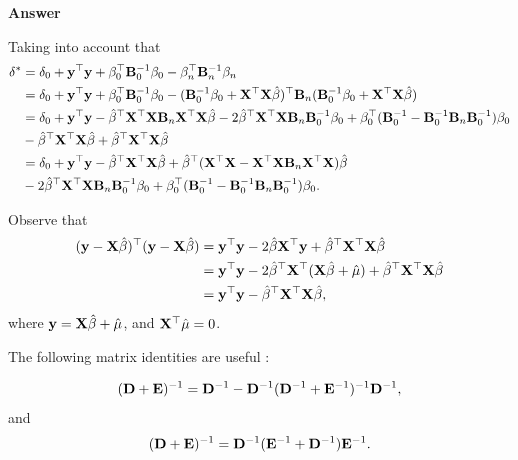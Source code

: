 \begin{enumerate}[leftmargin=*]
\textbf{Answer}

Taking into account that 
\begin{align*}
	\delta^* & = \delta_0 + {\bf{y}}^{\top}{\bf{y}} + \beta_0^{\top}{\bf{B}}_0^{-1}\beta_0 - \beta_n^{\top}{\bf{B}}_n^{-1}\beta_n \\
	& = \delta_0 + {\bf{y}}^{\top}{\bf{y}} + \beta_0^{\top}{\bf{B}}_0^{-1}\beta_0 -({\bf{B}}_0^{-1}\beta_0 + {\bf{X}}^{\top}{\bf{X}}\hat{\beta})^{\top}{\bf{B}}_n({\bf{B}}_0^{-1}\beta_0 + {\bf{X}}^{\top}{\bf{X}}\hat{\beta}) \\
	& = \delta_0 + {\bf{y}}^{\top}{\bf{y}} - \hat{\beta}^{\top}{\bf{X}}^{\top}{\bf{X}}{\bf{B}}_n{\bf{X}}^{\top}{\bf{X}}\hat{\beta} - 2\hat{\beta}^{\top}{\bf{X}}^{\top}{\bf{X}}{\bf{B}}_n{\bf{B}}_0^{-1}\beta_0 + \beta_0^{\top}({\bf{B}}_0^{-1} - {\bf{B}}_0^{-1}{\bf{B}}_n{\bf{B}}_0^{-1})\beta_0 \\
	&- \hat{\beta}^{\top}{\bf{X}}^{\top}{\bf{X}}\hat{\beta} + \hat{\beta}^{\top}{\bf{X}}^{\top}{\bf{X}}\hat{\beta} \\
	& = \delta_0 + {\bf{y}}^{\top}{\bf{y}} - \hat{\beta}^{\top}{\bf{X}}^{\top}{\bf{X}}\hat{\beta} + \hat{\beta}^{\top}({\bf{X}}^{\top}{\bf{X}} - {\bf{X}}^{\top}{\bf{X}}{\bf{B}}_n{\bf{X}}^{\top}{\bf{X}})\hat{\beta} \\
	& - 2\hat{\beta}^{\top}{\bf{X}}^{\top}{\bf{X}}{\bf{B}}_n{\bf{B}}_0^{-1}\beta_0 + \beta_0^{\top}({\bf{B}}_0^{-1} - {\bf{B}}_0^{-1}{\bf{B}}_n{\bf{B}}_0^{-1})\beta_0. 
\end{align*}

Observe that 
\begin{align*}
	({\bf{y}} - {\bf{X}}\hat{\beta})^{\top}({\bf{y}} - {\bf{X}}\hat{\beta}) & = {\bf{y}}^{\top}{\bf{y}} - 2\hat{\beta}{\bf{X}}^{\top}{\bf{y}} + \hat{\beta}^{\top}{\bf{X}}^{\top}{\bf{X}}\hat{\beta}\\
	& = {\bf{y}}^{\top}{\bf{y}} - 2\hat{\beta}^{\top}{\bf{X}}^{\top}({\bf{X}}\hat{\beta}+\hat{\mu}) + \hat{\beta}^{\top}{\bf{X}}^{\top}{\bf{X}}\hat{\beta}\\
	& = {\bf{y}}^{\top}{\bf{y}} - \hat{\beta}^{\top}{\bf{X}}^{\top}{\bf{X}}\hat{\beta},
\end{align*}
where ${\bf{y}}={\bf{X}}\hat{\beta}+\hat{\mu}$, and ${\bf{X}}^{\top}\hat{\mu}=0$.

The following matrix identities are useful \cite{Smith1973}:

\begin{equation*}
	({\bf{D}} + {\bf{E}})^{-1} = {\bf{D}}^{-1} - {\bf{D}}^{-1}({\bf{D}}^{-1} + {\bf{E}}^{-1})^{-1}{\bf{D}}^{-1},
\end{equation*}
and
\begin{equation*}
	({\bf{D}} + {\bf{E}})^{-1} = {\bf{D}}^{-1}({\bf{E}}^{-1} + {\bf{D}}^{-1}){\bf{E}}^{-1}.
\end{equation*}


\end{enumerate}
